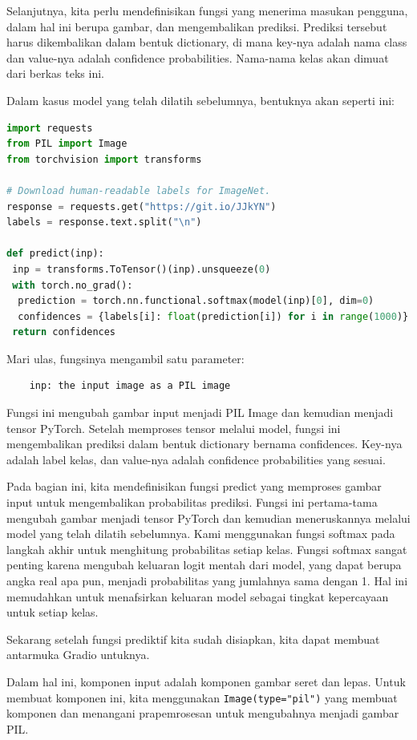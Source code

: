 \documentclass{article}
\begin{document}
Selanjutnya, kita perlu mendefinisikan fungsi yang menerima masukan pengguna, dalam hal ini berupa gambar, dan mengembalikan prediksi. Prediksi tersebut harus dikembalikan dalam bentuk dictionary, di mana key-nya adalah nama class dan value-nya adalah confidence probabilities. Nama-nama kelas akan dimuat dari berkas teks ini.

Dalam kasus model yang telah dilatih sebelumnya, bentuknya akan seperti ini:
\begin{lstlisting}[language=Python, caption={}, captionpos=b]
import requests
from PIL import Image
from torchvision import transforms

# Download human-readable labels for ImageNet.
response = requests.get("https://git.io/JJkYN")
labels = response.text.split("\n")

def predict(inp):
 inp = transforms.ToTensor()(inp).unsqueeze(0)
 with torch.no_grad():
  prediction = torch.nn.functional.softmax(model(inp)[0], dim=0)
  confidences = {labels[i]: float(prediction[i]) for i in range(1000)}
 return confidences
\end{lstlisting}

Mari ulas, fungsinya mengambil satu parameter:

\begin{verbatim}
    inp: the input image as a PIL image
\end{verbatim}

Fungsi ini mengubah gambar input menjadi PIL Image dan kemudian menjadi tensor PyTorch. Setelah memproses tensor melalui model, fungsi ini mengembalikan prediksi dalam bentuk dictionary bernama confidences. Key-nya adalah label kelas, dan value-nya adalah confidence probabilities yang sesuai.

Pada bagian ini, kita mendefinisikan fungsi predict yang memproses gambar input untuk mengembalikan probabilitas prediksi. Fungsi ini pertama-tama mengubah gambar menjadi tensor PyTorch dan kemudian meneruskannya melalui model yang telah dilatih sebelumnya. Kami menggunakan fungsi softmax pada langkah akhir untuk menghitung probabilitas setiap kelas. Fungsi softmax sangat penting karena mengubah keluaran logit mentah dari model, yang dapat berupa angka real apa pun, menjadi probabilitas yang jumlahnya sama dengan 1. Hal ini memudahkan untuk menafsirkan keluaran model sebagai tingkat kepercayaan untuk setiap kelas.

Sekarang setelah fungsi prediktif kita sudah disiapkan, kita dapat membuat antarmuka Gradio untuknya.

Dalam hal ini, komponen input adalah komponen gambar seret dan lepas. Untuk membuat komponen ini, kita menggunakan \verb|Image(type="pil")| yang membuat komponen dan menangani prapemrosesan untuk mengubahnya menjadi gambar PIL.
\end{document}
